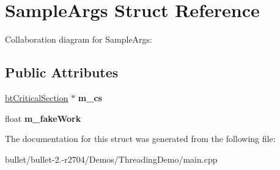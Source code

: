 \hypertarget{struct_sample_args}{\section{Sample\+Args Struct Reference}
\label{struct_sample_args}
}


Collaboration diagram for Sample\+Args\+:
\subsection*{Public Attributes}
\begin{DoxyCompactItemize}
\item 
\hypertarget{struct_sample_args_a4d8ae8f2d47f675a93530c1dd6429868}{\hyperlink{classbt_critical_section}{bt\+Critical\+Section} $\ast$ {\bfseries m\+\_\+cs}}\label{struct_sample_args_a4d8ae8f2d47f675a93530c1dd6429868}

\item 
\hypertarget{struct_sample_args_a4f3bf1f35cdcc7de9bab1ff912494fc8}{float {\bfseries m\+\_\+fake\+Work}}\label{struct_sample_args_a4f3bf1f35cdcc7de9bab1ff912494fc8}

\end{DoxyCompactItemize}


The documentation for this struct was generated from the following file\+:\begin{DoxyCompactItemize}
\item 
bullet/bullet-\/2.-\/r2704/\+Demos/\+Threading\+Demo/main.\+cpp\end{DoxyCompactItemize}
